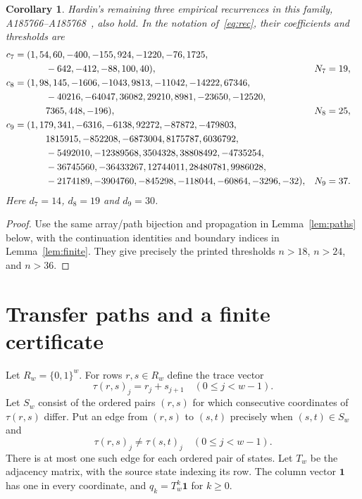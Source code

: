 \documentclass[11pt]{article}
\newtheorem{corollary}[theorem]{Corollary}
\newcommand{\one}{\mathbf{1}}
\begin{document}
\begin{corollary}\label{cor:siblings}
Hardin's remaining three empirical recurrences in this family,
A185766--A185768~\cite{oeis7,oeis8,oeis9}, also hold. In the notation
of~\eqref{eq:rec}, their coefficients and thresholds are
\begin{align}
c_7={}&(1,54,60,-400,-155,924,-1220,-76,1725,\notag\\
 &\qquad -642,-412,-88,100,40), &N_7&=19,\notag\\
c_8={}&(1,98,145,-1606,-1043,9813,-11042,-14222,67346,\notag\\
 &\qquad -40216,-64047,36082,29210,8981,-23650,-12520,\notag\\
 &\qquad 7365,448,-196), &N_8&=25,\label{eq:siblingcoeff}\\
c_9={}&(1,179,341,-6316,-6138,92272,-87872,-479803,\notag\\
 &\qquad 1815915,-852208,-6873004,8175787,6036792,\notag\\
 &\qquad -5492010,-12389568,3504328,38808492,-4735254,\notag\\
 &\qquad -36745560,-36433267,12744011,28480781,9986028,\notag\\
 &\qquad -2174189,-3904760,-845298,-118044,-60864,-3296,-32),
 &N_9&=37.\notag
\end{align}
Here $d_7=14$, $d_8=19$ and $d_9=30$.
\end{corollary}
\begin{proof}
Use the same array/path bijection and propagation in
Lemma~\ref{lem:paths} below, with the continuation identities and boundary
indices in Lemma~\ref{lem:finite}. They give precisely the printed
thresholds $n>18$, $n>24$, and $n>36$.
\end{proof}

\section{Transfer paths and a finite certificate}
Let $R_w=\{0,1\}^w$. For rows $r,s\in R_w$ define the trace vector
\[
 \tau(r,s)_j=r_j+s_{j+1}\quad(0\le j<w-1).
\]
Let $S_w$ consist of the ordered pairs $(r,s)$ for which consecutive
coordinates of $\tau(r,s)$ differ. Put an edge from $(r,s)$ to $(s,t)$
precisely when $(s,t)\in S_w$ and
\begin{equation}\label{eq:edge}
 \tau(r,s)_j\ne\tau(s,t)_j\quad(0\le j<w-1).
\end{equation}
There is at most one such edge for each ordered pair of states. Let $T_w$
be the adjacency matrix, with the source state indexing its row. The
column vector $\one$ has one in every coordinate, and
$q_k=T_w^k\one$ for $k\ge0$.
\end{document}
